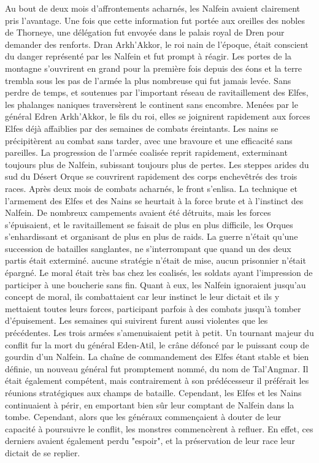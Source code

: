 \newline
Au bout de deux mois d'affrontements acharnés, les Nalfein avaient clairement pris l'avantage. Une fois que cette information fut portée aux oreilles des nobles de Thorneye, une délégation fut envoyée dans le palais royal de Dren pour demander des renforts. Dran Arkh'Akkor, le roi nain de l'époque, était conscient du danger représenté par les Nalfein et fut prompt à réagir. Les portes de la montagne s'ouvrirent en grand pour la première fois depuis des éons et la terre trembla sous les pas de l'armée la plus nombreuse qui fut jamais levée. Sans perdre de temps, et soutenues par l'important réseau de ravitaillement des Elfes, les phalanges naniques traversèrent le continent sans encombre. Menées par le général Edren Arkh'Akkor, le fils du roi, elles se joignirent rapidement aux forces Elfes déjà affaiblies par des semaines de combats éreintants. Les nains se précipitèrent au combat sans tarder, avec une bravoure et une efficacité sans pareilles. La progression de l'armée coalisée reprit rapidement, exterminant toujours plus de Nalfein, subissant toujours plus de pertes. Les steppes arides du sud du Désert Orque se couvrirent rapidement des corps enchevêtrés des trois races.
\newline
Après deux mois de combats acharnés, le front s'enlisa. La technique et l'armement des Elfes et des Nains se heurtait à la force brute et à l'instinct des Nalfein. De nombreux campements avaient été détruits, mais les forces s'épuisaient, et le ravitaillement se faisait de plus en plus difficile, les Orques s'enhardissant et organisant de plus en plus de raids. La guerre n'était qu'une succession de batailles sanglantes, ne s'interrompant que quand un des deux partis était exterminé. aucune stratégie n'était de mise, aucun prisonnier n'était épargné. Le moral était très bas chez les coalisés, les soldats ayant l'impression de participer à une boucherie sans fin. Quant à eux, les Nalfein ignoraient jusqu'au concept de moral, ils combattaient car leur instinct le leur dictait et ils y mettaient toutes leurs forces, participant parfois à des combats jusqu'à tomber d'épuisement.
\newline
Les semaines qui suivirent furent aussi violentes que les précédentes. Les trois armées s'amenuisaient petit à petit. Un tournant majeur du conflit fur la mort du général Eden-Atil, le crâne défoncé par le puissant coup de gourdin d'un Nalfein. La chaîne de commandement des Elfes étant stable et bien définie, un nouveau général fut promptement nommé, du nom de Tal'Angmar. Il était également compétent, mais contrairement à son prédécesseur il préférait les réunions stratégiques aux champs de bataille. Cependant, les Elfes et les Nains continuaient à périr, en emportant bien sûr leur comptant de Nalfein dans la tombe. Cependant, alors que les généraux commençaient à douter de leur capacité à poursuivre le conflit, les monstres commencèrent à refluer. En effet, ces derniers avaient également perdu "espoir", et la préservation de leur race leur dictait de se replier.
